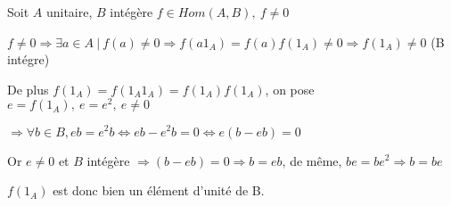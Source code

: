 
Soit $A$ unitaire, $B$ intégère $f \in Hom(A, B),\ f \neq 0$

$f \neq 0 \Rightarrow \exists a \in A\ |\ f(a) \neq 0 \Rightarrow f(a1_A)=f(a)f(1_A) \neq 0 \Rightarrow f(1_A) \neq 0$ (B intégre)

De plus $f(1_A) = f(1_A1_A) = f(1_A)f(1_A)$, on pose $e = f(1_A),\ e = e^2,\ e \neq 0$

$\Rightarrow \forall b \in B, eb = e^2b \Leftrightarrow eb - e^2b = 0\Leftrightarrow e(b - eb) = 0$

Or $e \neq 0$ et $B$ intégère $\Rightarrow (b - eb) = 0 \Rightarrow b = eb$, de même, $be = be^2 \Rightarrow b = be$

$f(1_A)$ est donc bien un élément d'unité de B.
